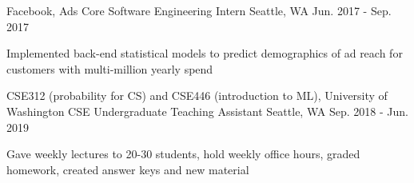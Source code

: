 \begin{cventries}
\begin{comment}
    \vspace{-0.6em}
  \cventry
    {Mode Lab, University of Washington CSE}
    {Undergraduate Research Assistant}
    {Seattle, WA}
    {Mar. 2018 - Sep. 2018}
    {
      \begin{cvitems}
        \item {Studying the application of linear dynamical systems (LDS) on creating sparse models for MEG data.}
        \item {Implemented stochastic gradient descent for inference of LDS using \textit{Python, numpy, Autograd, einsum2}}
      \end{cvitems}
    }
\end{comment}

    \vspace{-1.2em}
  \cventry
    {Facebook, Ads Core}
    {Software Engineering Intern}
    {Seattle, WA}
    {Jun. 2017 - Sep. 2017}
    {
      \begin{cvitems}
    \item {Implemented back-end statistical models to predict demographics of ad reach for customers with multi-million yearly spend}
      \end{cvitems}
    }
    \vspace{-1.2em}

  \cventry
    {CSE312 (probability for CS) and CSE446 (introduction to ML), University of Washington CSE}
    {Undergraduate Teaching Assistant}
    {Seattle, WA}
    {Sep. 2018 - Jun. 2019}
    {
      \begin{cvitems}
	    \item {Gave weekly lectures to 20-30 students, hold weekly office hours, graded homework, created answer keys and new material}
      \end{cvitems}
    }
    \vspace{-1.2em}

\begin{comment}
  \cventry
    {Ubiquitous Computing Laboratory, University of Washington CSE}
    {Undergraduate Research Assistant}
    {Seattle, WA}
    {Feb. 2016 - Jan. 2018}
    {
      \begin{cvitems}
        \item {Created ML models for error detection in spirometry, inferring lung health from audio, exposed REST api to use models}
	    \item {Created site in Django for collecting and labeling data, met with doctors monthly to coordinate efforts}
        \item {Languages: \textit{Python}. Technologies: \textit{Scikit-learn, Pandas, Tensorflow, Django}}
      \end{cvitems}
    }
    \vspace{-1.2em}
    

\end{comment}
\end{cventries}
